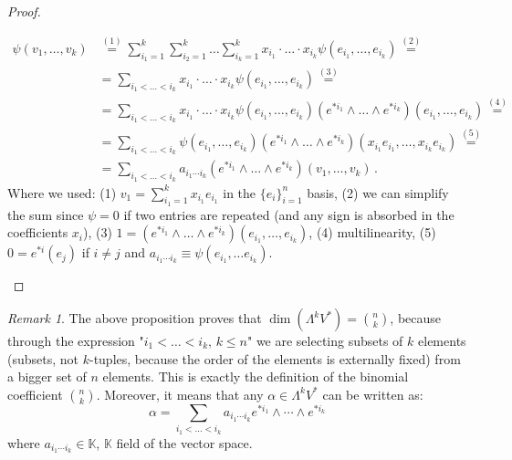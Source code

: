\documentclass[a4paper,11pt,titlepage, article, oneside]{memoir}
\numberwithin{equation}{section}
\theoremstyle{definition}
\theoremstyle{remark}
\newtheorem{remark}[theorem]{Remark}
\begin{document}
\begin{proof}[Proof]
\begin{itemize}
\begin{align*}
\psi(v_1, \ldots, v_k) &\overset{(1)}{=} \sum\limits_{i_1 = 1}^k \sum\limits_{i_2 = 1}^k \ldots \sum\limits_{i_k = 1}^k x_{i_1} \cdot \ldots \cdot x_{i_k} \psi(e_{i_1}, \ldots, e_{i_k}) \overset{(2)}{=} \\
&= \sum\limits_{i_1 < \ldots < i_k} x_{i_1} \cdot \ldots \cdot x_{i_k} \psi(e_{i_1}, \ldots, e_{i_k}) \overset{(3)}{=} \\
&= \sum\limits_{i_1 < \ldots < i_k} x_{i_1} \cdot \ldots \cdot x_{i_k} \psi(e_{i_1}, \ldots, e_{i_k}) (e^{*i_1} \wedge \ldots \wedge e^{*i_k}) (e_{i_1}, \ldots, e_{i_k}) \overset{(4)}{=} \\
&= \sum\limits_{i_1 < \ldots < i_k} \psi(e_{i_1}, \ldots, e_{i_k}) (e^{*i_1} \wedge \ldots \wedge e^{*i_k}) (x_{i_1}e_{i_1}, \ldots, x_{i_k}e_{i_k}) \overset{(5)}{=} \\
&= \sum\limits_{i_1 < \ldots < i_k} a_{i_1 \cdots i_k}(e^{*i_1} \wedge \ldots \wedge e^{*i_k}) (v_1, \ldots, v_k) \, .
\end{align*}
Where we used: (1) $v_1 = \sum\limits_{i_1 = 1}^k x_{i_1}e_{i_1}$ in the $\{e_i\}_{i=1}^n$ basis, (2) we can simplify the sum since $\psi=0$ if two entries are repeated (and any sign is absorbed in the coefficients $x_i$), (3) $1 = (e^{*i_1} \wedge \ldots \wedge e^{*i_k}) (e_{i_1}, \ldots, e_{i_k})$, (4) multilinearity, (5) $0 = e^{*i}(e_j)$ if $i \not = j$ and $a_{i_1 \cdots i_k} \equiv \psi(e_{i_1}, \ldots e_{i_k})$. \qedhere
\end{itemize}
\end{proof}

\begin{remarkbox}\begin{remark}
  The above proposition proves that $\dim(\Lambda^k V^*)=\binom{n}{k}$, because through the expression "$i_1 < \ldots < i_k, \, k \le n$" we are selecting subsets of $k$ elements (subsets, not $k$-tuples, because the order of the elements is externally fixed) from a bigger set of $n$ elements. This is exactly the definition of the binomial coefficient $\binom{n}{k}$. Moreover, it means that any $\alpha \in \Lambda^k V^*$ can be written as:
  \begin{equation*}
    \alpha = \sum\limits_{i_1 < \ldots < i_k} a_{i_1 \cdots i_k} e^{*i_1} \wedge \cdots \wedge e^{*i_k}
  \end{equation*}
  where $a_{i_1 \cdots i_k} \in \mathbb{K}$, $\mathbb{K}$ field of the vector space.
\end{remark}\end{remarkbox}
\end{document}
